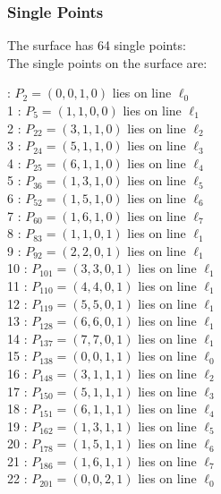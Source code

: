 \documentclass{article}
\begin{document}
{\subsubsection*{Single Points}
The surface has 64 single points:\\
The single points on the surface are:\\
\begin{multicols}{2}
 : $P_{2}=( 0, 0, 1, 0 )$ lies on line $\ell_{0}$\\
1 : $P_{5}=( 1, 1, 0, 0 )$ lies on line $\ell_{1}$\\
2 : $P_{22}=( 3, 1, 1, 0 )$ lies on line $\ell_{2}$\\
3 : $P_{24}=( 5, 1, 1, 0 )$ lies on line $\ell_{3}$\\
4 : $P_{25}=( 6, 1, 1, 0 )$ lies on line $\ell_{4}$\\
5 : $P_{36}=( 1, 3, 1, 0 )$ lies on line $\ell_{5}$\\
6 : $P_{52}=( 1, 5, 1, 0 )$ lies on line $\ell_{6}$\\
7 : $P_{60}=( 1, 6, 1, 0 )$ lies on line $\ell_{7}$\\
8 : $P_{83}=( 1, 1, 0, 1 )$ lies on line $\ell_{1}$\\
9 : $P_{92}=( 2, 2, 0, 1 )$ lies on line $\ell_{1}$\\
10 : $P_{101}=( 3, 3, 0, 1 )$ lies on line $\ell_{1}$\\
11 : $P_{110}=( 4, 4, 0, 1 )$ lies on line $\ell_{1}$\\
12 : $P_{119}=( 5, 5, 0, 1 )$ lies on line $\ell_{1}$\\
13 : $P_{128}=( 6, 6, 0, 1 )$ lies on line $\ell_{1}$\\
14 : $P_{137}=( 7, 7, 0, 1 )$ lies on line $\ell_{1}$\\
15 : $P_{138}=( 0, 0, 1, 1 )$ lies on line $\ell_{0}$\\
16 : $P_{148}=( 3, 1, 1, 1 )$ lies on line $\ell_{2}$\\
17 : $P_{150}=( 5, 1, 1, 1 )$ lies on line $\ell_{3}$\\
18 : $P_{151}=( 6, 1, 1, 1 )$ lies on line $\ell_{4}$\\
19 : $P_{162}=( 1, 3, 1, 1 )$ lies on line $\ell_{5}$\\
20 : $P_{178}=( 1, 5, 1, 1 )$ lies on line $\ell_{6}$\\
21 : $P_{186}=( 1, 6, 1, 1 )$ lies on line $\ell_{7}$\\
22 : $P_{201}=( 0, 0, 2, 1 )$ lies on line $\ell_{0}$\\

\end{multicols}}
\end{document}
